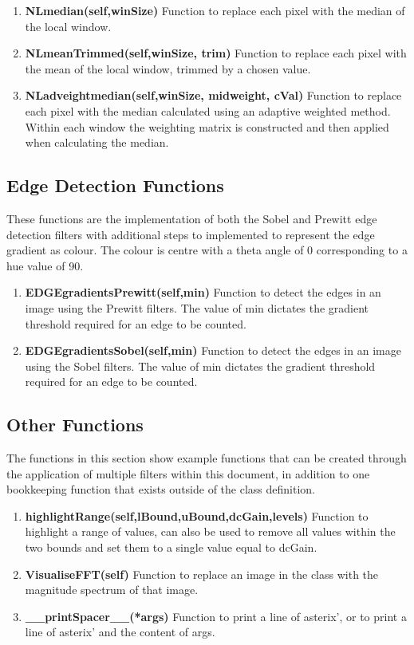 \documentclass{article}
\begin{document}
\begin{enumerate}
	\item{\textbf{NLmedian(self,winSize)}} Function to replace each pixel with the median of the local window.
	\item{\textbf{NLmeanTrimmed(self,winSize, trim)}} Function to replace each pixel with the mean of the local window, trimmed by a chosen value.
	\item{\textbf{NLadveightmedian(self,winSize, midweight, cVal)}} Function to replace each pixel with the median calculated using an adaptive weighted method. Within each window the weighting matrix is constructed and then applied when calculating the median.
	\end{enumerate}

\subsection{Edge Detection Functions}
These functions are the implementation of both the Sobel and Prewitt edge detection filters with additional steps to implemented to represent the edge gradient as colour. The colour is centre with a theta angle of 0 corresponding to a hue value of 90.
\begin{enumerate}
	\item{\textbf{EDGEgradientsPrewitt(self,min)}} Function to detect the edges in an image using the Prewitt filters. The value of min dictates the gradient threshold required for an edge to be counted.
	\item{\textbf{EDGEgradientsSobel(self,min)}} Function to detect the edges in an image using the Sobel filters. The value of min dictates the gradient threshold required for an edge to be counted.
\end{enumerate}

\subsection{Other Functions}
The functions in this section show example functions that can be created through the application of multiple filters within this document, in addition to one bookkeeping function that exists outside of the class definition.
\begin{enumerate}
	\item{\textbf{highlightRange(self,lBound,uBound,dcGain,levels)}} Function to highlight a range of values, can also be used to remove all values within the two bounds and set them to a single value equal to dcGain.
	\item{\textbf{VisualiseFFT(self)}} Function to replace an image in the class with the magnitude spectrum of that image.
	\item{\textbf{\_\_printSpacer\_\_(*args)}} Function to print a line of asterix', or to print a line of asterix' and the content of args.
\end{enumerate}
\end{document}
